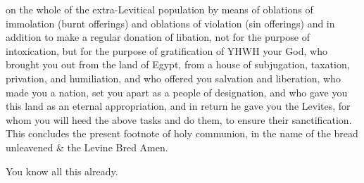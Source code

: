 {{{{{                        on the whole of the extra-Levitical population
                        by means of
                        oblations of immolation (burnt offerings)
                        and
                        oblations of violation (sin offerings)
                        and in addition to make a regular donation of libation,
                        not for the purpose of intoxication,
                        but for the purpose of gratification of
                        YHWH your God, who brought you out from the land of Egypt,
                        from a house of subjugation, taxation, privation, and humiliation,
                        and who offered you salvation and liberation,
                        who made you a nation, set you apart as a people of designation,
                        and who gave you this land as an eternal appropriation,
                        and in return he gave you the Levites, for whom you
                        will heed the above tasks and do them, to ensure their sanctification.
                        This concludes the present footnote of
                        holy communion,
                        in the name of the
                        bread unleavened \& the
                        Levine Bred
                        \;%
                        Amen.
                    }}%
                }

                You know all this already.

				\pagebreak[2]




}}
